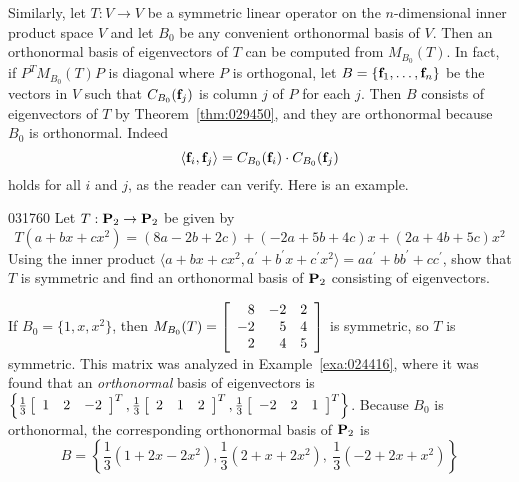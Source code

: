 Similarly, let $T : V \to V$ be a symmetric linear operator on the $n$-dimensional inner product space $V$ and let $B_{0}$ be any convenient orthonormal basis of $V$. Then an orthonormal basis of eigenvectors of $T$ can be computed from $M_{B_0}(T)$. In fact, if $P^T M_{B_0}(T)P$ is diagonal where $P$ is orthogonal, let $B = \{\textbf{f}_{1}, \dots, \textbf{f}_{n}\}$ be the vectors in $V$ such that $C_{B_{0}}(\textbf{f}_{j})$ is column $j$ of $P$ for each $j$. Then $B$ consists of eigenvectors of $T$ by Theorem~\ref{thm:029450}, and they are orthonormal because $B_{0}$ is orthonormal. Indeed
\begin{equation*}
\langle \textbf{f}_i, \textbf{f}_j \rangle = C_{B_0}(\textbf{f}_i) \cdot C_{B_0}(\textbf{f}_j)
\end{equation*}
holds for all $i$ and $j$, as the reader can verify. Here is an example.

\begin{example}{}{031760}
Let $T : \textbf{P}_{2} \to \textbf{P}_{2}$ be given by
\begin{equation*}
T(a + bx + cx^2) = (8a - 2b + 2c) + (-2a + 5b + 4c)x + (2a + 4b + 5c)x^2
\end{equation*}
Using the inner product $\langle a + bx + cx^{2}, a^\prime + b^{\prime}x + c^{\prime}x^{2} \rangle = aa^\prime + bb^\prime + cc^\prime$, show that $T$ is symmetric and find an orthonormal basis of $\textbf{P}_{2}$ consisting of eigenvectors.

\begin{solution}
If $B_{0} = \{1, x, x^{2}\}$, then 
$M_{B_0}(T) = 
\left[ \begin{array}{rrr}
8 & -2 & 2 \\
-2 & 5 & 4 \\
2 & 4 & 5
\end{array} \right]$ is symmetric, so $T$ is symmetric. This matrix was analyzed in Example~\ref{exa:024416}, where it was found that an \textit{orthonormal} basis of eigenvectors is $\left\{\tfrac{1}{3} 
\left[ \begin{array}{ccc}
1 & 2 & -2 
\end{array} \right]^T, \tfrac{1}{3}
\left[ \begin{array}{ccc}
2 & 1 & 2
\end{array} \right]^T, \tfrac{1}{3}
\left[ \begin{array}{ccc} 
-2 & 2 & 1 
\end{array} \right]^T
\right \}$. Because $B_{0}$ is orthonormal, the corresponding orthonormal basis of $\textbf{P}_{2}$ is
\begin{equation*}
B = \left\{\frac{1}{3} (1 + 2x - 2x^2), \frac{1}{3}(2 + x + 2x^2),\
\frac{1}{3}(-2 + 2x + x^2) \right\}
\end{equation*}
\end{solution}
\end{example}

